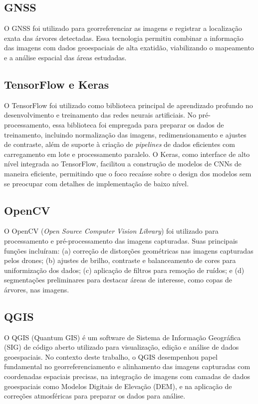 \documentclass[
    12pt,
    openright,
    oneside,
    a4paper,
    sumario=tradicional,
    english,
    brazil,
    ]{abntex2}
\begin{document}
\subsection{GNSS}

O GNSS foi utilizado para georreferenciar as imagens e registrar a localização exata das árvores detectadas. Essa tecnologia permitiu combinar a informação das imagens com dados geoespaciais de alta exatidão, viabilizando o mapeamento e a análise espacial das áreas estudadas.

\subsection{TensorFlow e Keras}

O TensorFlow foi utilizado como biblioteca principal de aprendizado profundo no desenvolvimento e treinamento das redes neurais artificiais. No pré-processamento, essa biblioteca foi empregada para preparar os dados de treinamento, incluindo normalização das imagens, redimensionamento e ajustes de contraste, além de suporte à criação de \textit{pipelines} de dados eficientes com carregamento em lote e processamento paralelo. O Keras, como interface de alto nível integrada ao TensorFlow, facilitou a construção de modelos de CNNs de maneira eficiente, permitindo que o foco recaísse sobre o design dos modelos sem se preocupar com detalhes de implementação de baixo nível.

\subsection{OpenCV}

O OpenCV (\textit{Open Source Computer Vision Library}) foi utilizado para processamento e pré-processamento das imagens capturadas. Suas principais funções incluíram: (a) correção de distorções geométricas nas imagens capturadas pelos drones; (b) ajustes de brilho, contraste e balanceamento de cores para uniformização dos dados; (c) aplicação de filtros para remoção de ruídos; e (d) segmentações preliminares para destacar áreas de interesse, como copas de árvores, nas imagens.

\subsection{QGIS}

O QGIS (Quantum GIS) é um software de Sistema de Informação Geográfica (SIG) de código aberto utilizado para visualização, edição e análise de dados geoespaciais. No contexto deste trabalho, o QGIS desempenhou papel fundamental no georreferenciamento e alinhamento das imagens capturadas com coordenadas espaciais precisas, na integração de imagens com camadas de dados geoespaciais como Modelos Digitais de Elevação (DEM), e na aplicação de correções atmosféricas para preparar os dados para análise.
\end{document}
